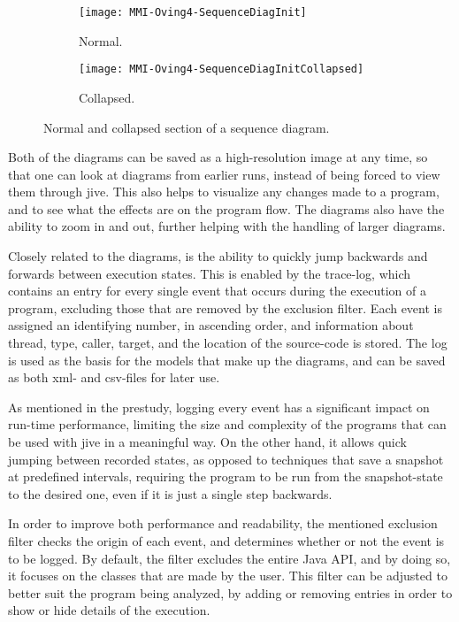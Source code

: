 \begin{figure}[H]
	\centering
	\begin{subfigure}{\textwidth}
		\centering
		\texttt{[image: MMI-Oving4-SequenceDiagInit]}
		\caption{Normal.}
		\label{fig:seqOving4CollapseA}
	\end{subfigure}
	\begin{subfigure}{\textwidth}
		\centering
		\texttt{[image: MMI-Oving4-SequenceDiagInitCollapsed]}
		\caption{Collapsed.}
		\label{fig:seqOving4CollapseB}
	\end{subfigure}
	\caption{Normal and collapsed section of a sequence diagram.}
	\label{fig:seqOving4Collapse} 
\end{figure}

Both of the diagrams can be saved as a high-resolution image at any time, so that one can look at diagrams from earlier runs, instead of being forced to view them through \gls{jive}.
This also helps to visualize any changes made to a program, and to see what the effects are on the program flow.
The diagrams also have the ability to zoom in and out, further helping with the handling of larger diagrams.

Closely related to the diagrams, is the ability to quickly jump backwards and forwards between execution states.
This is enabled by the trace-log, which contains an entry for every single event that occurs during the execution of a program, excluding those that are removed by the exclusion filter.
Each event is assigned an identifying number, in ascending order, and information about thread, type, caller, target, and the location of the source-code is stored.
The log is used as the basis for the models that make up the diagrams, and can be saved as both \gls{xml}- and \gls{csv}-files for later use.

As mentioned in the prestudy, logging every event has a significant impact on run-time performance, limiting the size and complexity of the programs that can be used with \gls{jive} in a meaningful way.
On the other hand, it allows quick jumping between recorded states, as opposed to techniques that save a snapshot at predefined intervals, requiring the program to be run from the snapshot-state to the desired one, even if it is just a single step backwards.

In order to improve both performance and readability, the mentioned exclusion filter checks the origin of each event, and determines whether or not the event is to be logged.
By default, the filter excludes the entire Java API, and by doing so, it focuses on the classes that are made by the user.
This filter can be adjusted to better suit the program being analyzed, by adding or removing entries in order to show or hide details of the execution.

